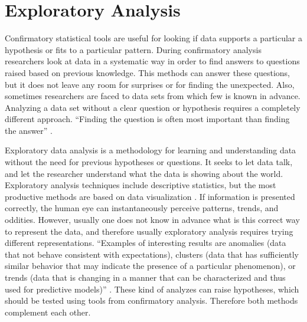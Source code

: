 


\section{Exploratory Analysis}

%


Confirmatory statistical tools are useful for looking if data supports a particular a hypothesis or fits to a particular pattern.  During confirmatory analysis researchers look at data in a systematic way in order to find answers to questions raised based on previous knowledge. This methods can answer these questions, but it does not leave any room for surprises or for finding the unexpected. Also, sometimes researchers are faced to data sets from which few is known in advance. Analyzing a data set without a clear question or hypothesis requires a completely different approach. ``Finding the question is often most important than finding the answer'' \autocite{tukey_we_1980}.

Exploratory data analysis is a methodology for learning and understanding data without the need for previous hypotheses or questions. It seeks to let data talk, and let the researcher understand what the data is showing about the world. Exploratory analysis techniques include descriptive statistics, but the most productive methods are based on data visualization \autocite{tukey_exploratory_1977}. If information is presented correctly, the human eye can instantaneously perceive patterns, trends, and oddities. However, usually one does not know in advance what is this correct way to represent the data, and therefore usually exploratory analysis requires trying different representations. ``Examples of interesting results are anomalies (data that not behave consistent with expectations), clusters (data that has sufficiently similar behavior that may indicate the presence of a particular phenomenon), or trends (data that is changing in a manner that can be characterized and thus used for predictive models)'' \autocite{ward_interactive_2010}.
These kind of analyzes can raise hypotheses, which should be tested using tools from confirmatory analysis. Therefore both methods complement each other.

